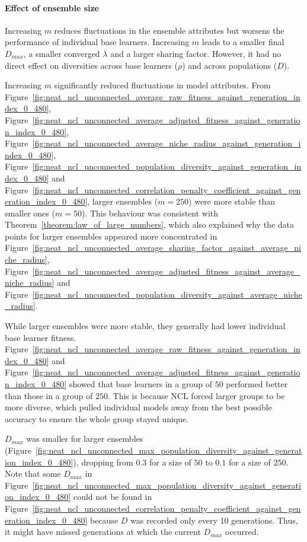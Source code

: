 \paragraph{Effect of ensemble size}
Increasing $m$ reduces fluctuations in the ensemble attributes but worsens the performance of individual base learners. Increasing $m$ leads to a smaller final $D_{max}$, a smaller converged $\lambda$ and a larger sharing factor. However, it had no direct effect on diversities across base learners ($\rho$) and across populations ($D$). 

Increasing $m$ significantly reduced fluctuations in model attributes. From Figure~\ref{fig:neat_ncl_unconnected_average_raw_fitness_against_generation_index_0_480}, Figure~\ref{fig:neat_ncl_unconnected_average_adjusted_fitness_against_generation_index_0_480}, Figure~\ref{fig:neat_ncl_unconnected_average_niche_radius_against_generation_index_0_480}, Figure~\ref{fig:neat_ncl_unconnected_population_diversity_against_generation_index_0_480} and Figure~\ref{fig:neat_ncl_unconnected_correlation_penalty_coefficient_against_generation_index_0_480}, larger ensembles ($m = 250$) were more stable than smaller ones ($m = 50$). This behaviour was consistent with Theorem~\ref{theorem:law_of_large_numbers}, which also explained why the data points for larger ensembles appeared more concentrated in Figure~\ref{fig:neat_ncl_unconnected_average_sharing_factor_against_average_niche_radius}, Figure~\ref{fig:neat_ncl_unconnected_average_adjusted_fitness_against_average_niche_radius} and Figure~\ref{fig:neat_ncl_unconnected_population_diversity_against_average_niche_radius}. 

While larger ensembles were more stable, they generally had lower individual base learner fitness. Figure~\ref{fig:neat_ncl_unconnected_average_raw_fitness_against_generation_index_0_480} and Figure~\ref{fig:neat_ncl_unconnected_average_adjusted_fitness_against_generation_index_0_480} showed that base learners in a group of $50$ performed better than those in a group of $250$. This is because NCL forced larger groups to be more diverse, which pulled individual models away from the best possible accuracy to ensure the whole group stayed unique. 

$D_{max}$ was smaller for larger ensembles (Figure~\ref{fig:neat_ncl_unconnected_max_population_diversity_against_generation_index_0_480}), dropping from $0.3$ for a size of $50$ to $0.1$ for a size of $250$. Note that some $D_{max}$ in Figure~\ref{fig:neat_ncl_unconnected_max_population_diversity_against_generation_index_0_480} could not be found in Figure~\ref{fig:neat_ncl_unconnected_correlation_penalty_coefficient_against_generation_index_0_480} because $D$ was recorded only every 10 generations. Thus, it might have missed generations at which the current $D_{max}$ occurred. 

